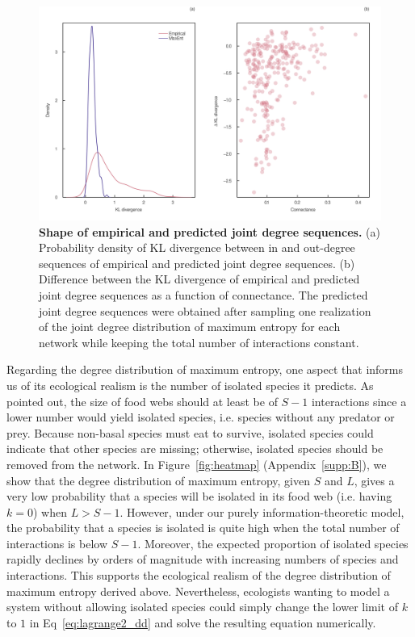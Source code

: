 \begin{figure}[!h]
  \centering
  \includegraphics[width=\textwidth]{figures/article2/kl_divergence.png}
  \caption{\textbf{Shape of empirical and predicted joint degree sequences.}
  (a) Probability density of KL divergence between in and out-degree sequences of
  empirical and predicted joint degree sequences. (b) Difference between the KL
  divergence of empirical and predicted joint degree sequences as a function of
  connectance. The predicted joint degree sequences were obtained after sampling
  one realization of the joint degree distribution of maximum entropy for each
  network while keeping the total number of interactions constant.}
\label{fig:kl_diverg}
\end{figure}

\clearpage

Regarding the degree distribution of maximum entropy, one aspect that informs us
of its ecological realism is the number of isolated species it predicts. As
\cite{MacDonald2020Revisiting} pointed out, the size of food webs should at
least be of $S-1$ interactions since a lower number would yield isolated
species, i.e. species without any predator or prey. Because non-basal species
must eat to survive, isolated species could indicate that other species are
missing; otherwise, isolated species should be removed from the network. In
Figure~\ref{fig:heatmap} (Appendix~\ref{supp:B}), we show that the degree
distribution of maximum entropy, given $S$ and $L$, gives a very low probability
that a species will be isolated in its food web (i.e. having $k = 0$) when $L >
S-1$. However, under our purely information-theoretic model, the probability
that a species is isolated is quite high when the total number of interactions
is below $S-1$. Moreover, the expected proportion of isolated species rapidly
declines by orders of magnitude with increasing numbers of species and
interactions. This supports the ecological realism of the degree distribution of
maximum entropy derived above. Nevertheless, ecologists wanting to model a
system without allowing isolated species could simply change the lower limit of
$k$ to $1$ in Eq~\ref{eq:lagrange2_dd} and solve the resulting equation
numerically.

